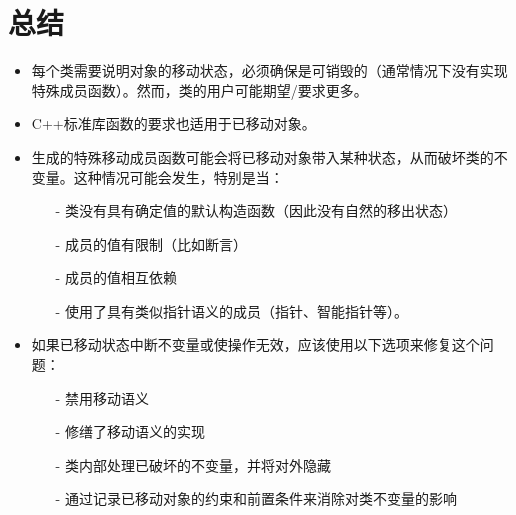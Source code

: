 \section{总结}
\begin{itemize}
	\item 每个类需要说明对象的移动状态，必须确保是可销毁的（通常情况下没有实现特殊成员函数）。然而，类的用户可能期望/要求更多。
	\item C++标准库函数的要求也适用于已移动对象。
	\item 生成的特殊移动成员函数可能会将已移动对象带入某种状态，从而破坏类的不变量。这种情况可能会发生，特别是当：
	\begin{itemize}
		\item[-] 类没有具有确定值的默认构造函数（因此没有自然的移出状态）
		\item[-] 成员的值有限制（比如断言）
		\item[-] 成员的值相互依赖
		\item[-] 使用了具有类似指针语义的成员（指针、智能指针等）。
	\end{itemize}
	\item 如果已移动状态中断不变量或使操作无效，应该使用以下选项来修复这个问题：
	\begin{itemize}
		\item[-] 禁用移动语义
		\item[-] 修缮了移动语义的实现
		\item[-] 类内部处理已破坏的不变量，并将对外隐藏
		\item[-] 通过记录已移动对象的约束和前置条件来消除对类不变量的影响
	\end{itemize}
\end{itemize}


